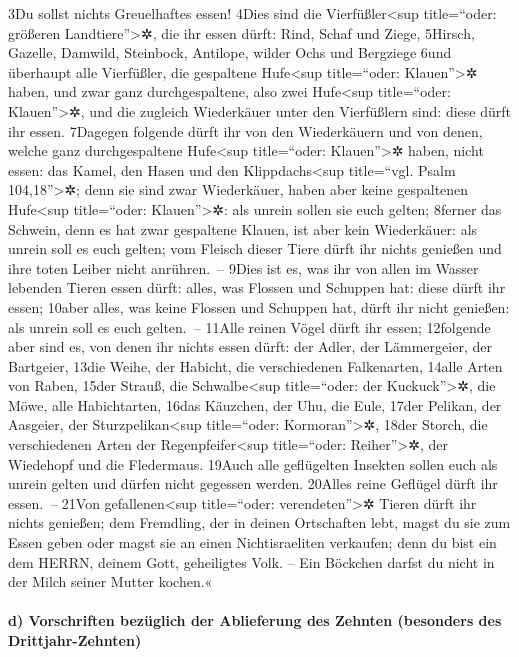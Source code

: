 3Du sollst nichts Greuelhaftes essen! 4Dies sind die
Vierfüßler\textless sup title=``oder: größeren Landtiere''\textgreater✲,
die ihr essen dürft: Rind, Schaf und Ziege, 5Hirsch, Gazelle, Damwild,
Steinbock, Antilope, wilder Ochs und Bergziege 6und überhaupt alle
Vierfüßler, die gespaltene Hufe\textless sup title=``oder:
Klauen''\textgreater✲ haben, und zwar ganz durchgespaltene, also zwei
Hufe\textless sup title=``oder: Klauen''\textgreater✲, und die zugleich
Wiederkäuer unter den Vierfüßlern sind: diese dürft ihr essen. 7Dagegen
folgende dürft ihr von den Wiederkäuern und von denen, welche ganz
durchgespaltene Hufe\textless sup title=``oder: Klauen''\textgreater✲
haben, nicht essen: das Kamel, den Hasen und den Klippdachs\textless sup
title=``vgl. Psalm 104,18''\textgreater✲; denn sie sind zwar
Wiederkäuer, haben aber keine gespaltenen Hufe\textless sup
title=``oder: Klauen''\textgreater✲: als unrein sollen sie euch gelten;
8ferner das Schwein, denn es hat zwar gespaltene Klauen, ist aber kein
Wiederkäuer: als unrein soll es euch gelten; vom Fleisch dieser Tiere
dürft ihr nichts genießen und ihre toten Leiber nicht anrühren.~-- 9Dies
ist es, was ihr von allen im Wasser lebenden Tieren essen dürft: alles,
was Flossen und Schuppen hat: diese dürft ihr essen; 10aber alles, was
keine Flossen und Schuppen hat, dürft ihr nicht genießen: als unrein
soll es euch gelten.~-- 11Alle reinen Vögel dürft ihr essen; 12folgende
aber sind es, von denen ihr nichts essen dürft: der Adler, der
Lämmergeier, der Bartgeier, 13die Weihe, der Habicht, die verschiedenen
Falkenarten, 14alle Arten von Raben, 15der Strauß, die
Schwalbe\textless sup title=``oder: der Kuckuck''\textgreater✲, die
Möwe, alle Habichtarten, 16das Käuzchen, der Uhu, die Eule, 17der
Pelikan, der Aasgeier, der Sturzpelikan\textless sup title=``oder:
Kormoran''\textgreater✲, 18der Storch, die verschiedenen Arten der
Regenpfeifer\textless sup title=``oder: Reiher''\textgreater✲, der
Wiedehopf und die Fledermaus. 19Auch alle geflügelten Insekten sollen
euch als unrein gelten und dürfen nicht gegessen werden. 20Alles reine
Geflügel dürft ihr essen.~-- 21Von gefallenen\textless sup title=``oder:
verendeten''\textgreater✲ Tieren dürft ihr nichts genießen; dem
Fremdling, der in deinen Ortschaften lebt, magst du sie zum Essen geben
oder magst sie an einen Nichtisraeliten verkaufen; denn du bist ein dem
HERRN, deinem Gott, geheiligtes Volk. -- Ein Böckchen darfst du nicht in
der Milch seiner Mutter kochen.«

\hypertarget{d-vorschriften-bezuxfcglich-der-ablieferung-des-zehnten-besonders-des-drittjahr-zehnten}{%
\paragraph{d) Vorschriften bezüglich der Ablieferung des Zehnten
(besonders des
Drittjahr-Zehnten)}\label{d-vorschriften-bezuxfcglich-der-ablieferung-des-zehnten-besonders-des-drittjahr-zehnten}}

